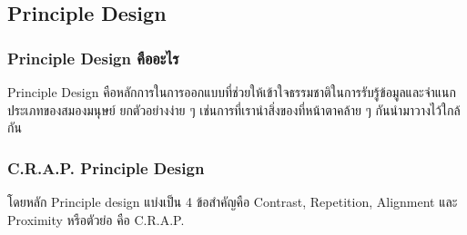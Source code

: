 \documentclass[14pt,oneside,openright,a4paper]{cpe-thai-project}
\begin{document}
\subsection{Principle Design}
  \subsubsection {Principle Design คืออะไร}
  Principle Design \cite{PrincipleDesign} คือหลักการในการออกแบบที่ช่วยให้เข้าใจธรรมชาติในการรับรู้ข้อมูลและจำแนกประเภทของสมองมนุษย์ ยกตัวอย่างง่าย ๆ เช่นการที่เรานำสิ่งของที่หน้าตาคล้าย ๆ กันนำมาวางไว้ใกล้กัน

  \newpage

\subsubsection {C.R.A.P. Principle Design}
  โดยหลัก Principle design แบ่งเป็น 4 ข้อสำคัญคือ Contrast, Repetition, Alignment และ Proximity หรือตัวย่อ คือ C.R.A.P.
\end{document}
